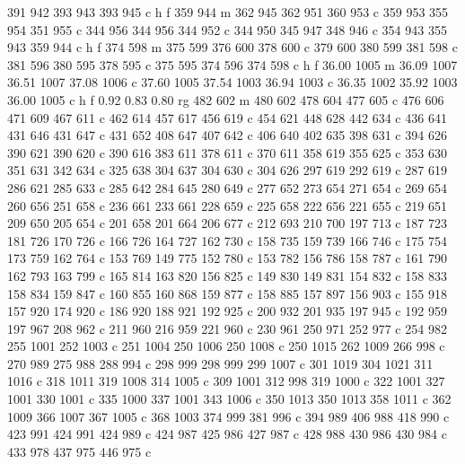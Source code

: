 {{        391 942 393 943 393 945 c
        h f
        359 944 m
        362 945 362 951 360 953 c
        359 953 355 954 351 955 c
        344 956 344 956 344 952 c
        344 950 345 947 348 946 c
        354 943 355 943 359 944 c
        h f
        374 598 m
        375 599 376 600 378 600 c
        379 600 380 599 381 598 c
        381 596 380 595 378 595 c
        375 595 374 596 374 598 c
        h f
        36.00 1005 m
        36.09 1007 36.51 1007 37.08 1006 c
        37.60 1005 37.54 1003 36.94 1003 c
        36.35 1002 35.92 1003 36.00 1005 c
        h f
        0.92 0.83 0.80 rg
        482 602 m
        480 602 478 604 477 605 c
        476 606 471 609 467 611 c
        462 614 457 617 456 619 c
        454 621 448 628 442 634 c
        436 641 431 646 431 647 c
        431 652 408 647 407 642 c
        406 640 402 635 398 631 c
        394 626 390 621 390 620 c
        390 616 383 611 378 611 c
        370 611 358 619 355 625 c
        353 630 351 631 342 634 c
        325 638 304 637 304 630 c
        304 626 297 619 292 619 c
        287 619 286 621 285 633 c
        285 642 284 645 280 649 c
        277 652 273 654 271 654 c
        269 654 260 656 251 658 c
        236 661 233 661 228 659 c
        225 658 222 656 221 655 c
        219 651 209 650 205 654 c
        201 658 201 664 206 677 c
        212 693 210 700 197 713 c
        187 723 181 726 170 726 c
        166 726 164 727 162 730 c
        158 735 159 739 166 746 c
        175 754 173 759 162 764 c
        153 769 149 775 152 780 c
        153 782 156 786 158 787 c
        161 790 162 793 163 799 c
        165 814 163 820 156 825 c
        149 830 149 831 154 832 c
        158 833 158 834 159 847 c
        160 855 160 868 159 877 c
        158 885 157 897 156 903 c
        155 918 157 920 174 920 c
        186 920 188 921 192 925 c
        200 932 201 935 197 945 c
        192 959 197 967 208 962 c
        211 960 216 959 221 960 c
        230 961 250 971 252 977 c
        254 982 255 1001 252 1003 c
        251 1004 250 1006 250 1008 c
        250 1015 262 1009 266 998 c
        270 989 275 988 288 994 c
        298 999 298 999 299 1007 c
        301 1019 304 1021 311 1016 c
        318 1011 319 1008 314 1005 c
        309 1001 312 998 319 1000 c
        322 1001 327 1001 330 1001 c
        335 1000 337 1001 343 1006 c
        350 1013 350 1013 358 1011 c
        362 1009 366 1007 367 1005 c
        368 1003 374 999 381 996 c
        394 989 406 988 418 990 c
        423 991 424 991 424 989 c
        424 987 425 986 427 987 c
        428 988 430 986 430 984 c
        433 978 437 975 446 975 c
}}
